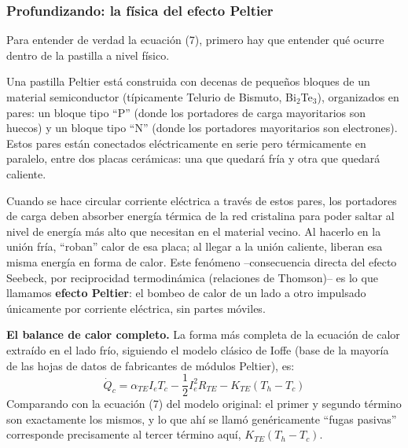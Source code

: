 \documentclass[11pt,a4paper]{article}
\begin{document}
\subsubsection{Profundizando: la física del efecto Peltier}
Para entender de verdad la ecuación (7), primero hay que entender qué ocurre dentro de la pastilla a nivel físico.

Una pastilla Peltier está construida con decenas de pequeños bloques de un material semiconductor (típicamente Telurio de Bismuto, Bi$_2$Te$_3$), organizados en pares: un bloque tipo ``P'' (donde los portadores de carga mayoritarios son huecos) y un bloque tipo ``N'' (donde los portadores mayoritarios son electrones). Estos pares están conectados eléctricamente en serie pero térmicamente en paralelo, entre dos placas cerámicas: una que quedará fría y otra que quedará caliente.

Cuando se hace circular corriente eléctrica a través de estos pares, los portadores de carga deben absorber energía térmica de la red cristalina para poder saltar al nivel de energía más alto que necesitan en el material vecino. Al hacerlo en la unión fría, ``roban'' calor de esa placa; al llegar a la unión caliente, liberan esa misma energía en forma de calor. Este fenómeno --consecuencia directa del efecto Seebeck, por reciprocidad termodinámica (relaciones de Thomson)-- es lo que llamamos \textbf{efecto Peltier}: el bombeo de calor de un lado a otro impulsado únicamente por corriente eléctrica, sin partes móviles.

\textbf{El balance de calor completo.} La forma más completa de la ecuación de calor extraído en el lado frío, siguiendo el modelo clásico de Ioffe (base de la mayoría de las hojas de datos de fabricantes de módulos Peltier), es:
\begin{equation}
\dot{Q}_c = \alpha_{TE} I_e T_c - \frac{1}{2} I_e^2 R_{TE} - K_{TE}(T_h - T_c)
\end{equation}
Comparando con la ecuación (7) del modelo original: el primer y segundo término son exactamente los mismos, y lo que ahí se llamó genéricamente ``fugas pasivas'' corresponde precisamente al tercer término aquí, $K_{TE}(T_h-T_c)$.
\end{document}
